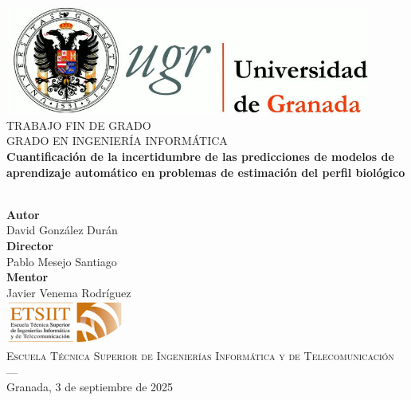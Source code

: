 \begin{titlepage}
\thispagestyle{empty}

\begin{center}
\includegraphics[width=0.9\textwidth]{portada/imagenes/logo_ugr.jpg}\\[1.4cm]

\textsc{ \Large TRABAJO FIN DE GRADO\\[0.2cm]}
\textsc{ GRADO EN INGENIERÍA INFORMÁTICA}\\[1cm]

{\LARGE \bfseries Cuantificación de la incertidumbre de las predicciones de modelos de aprendizaje automático en problemas de estimación del perfil biológico\\}
\noindent\\[3.5ex]
\end{center}

\vspace{0.5cm}

\begin{center}
\textbf{Autor}\\ {David González Durán}\\[2.5ex]
\textbf{Director}\\ {Pablo Mesejo Santiago}\\[2.5ex]
\textbf{Mentor}\\{Javier Venema Rodríguez}\\[2cm]
\includegraphics[width=0.3\textwidth]{portada/imagenes/etsiit_logo.png}\\[0.1cm]
\textsc{Escuela Técnica Superior de Ingenierías Informática y de Telecomunicación}\\
\textsc{---}\\
Granada, 3 de septiembre de 2025
\end{center}

\end{titlepage}
